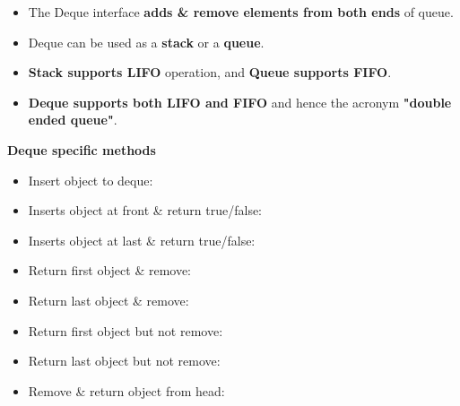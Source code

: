 \setlength{\columnsep}{3pt}
\begin{flushleft}

\begin{itemize}
	\item The Deque interface \textbf{adds \& remove elements from both ends} of queue.
	\item Deque can be used as a \textbf{stack} or a \textbf{queue}. 
	\item \textbf{Stack supports LIFO} operation, and \textbf{Queue supports FIFO}. 
	\item \textbf{Deque supports both LIFO and FIFO} and hence the acronym \textbf{"double ended queue"}.
	
	
\end{itemize}
	
	\textbf{Deque specific methods}
	
	\begin{itemize}
		
		\item Insert object to deque:
		\item Inserts object at front \& return true/false:
		\item Inserts object at last \& return true/false:
		\item Return first object \& remove:
	
		\item Return last object \& remove:
		
		\item Return first object but not remove:
		\item Return last object but not remove:
		\item Remove \& return object from head:
	\end{itemize}
	
\end{flushleft}

